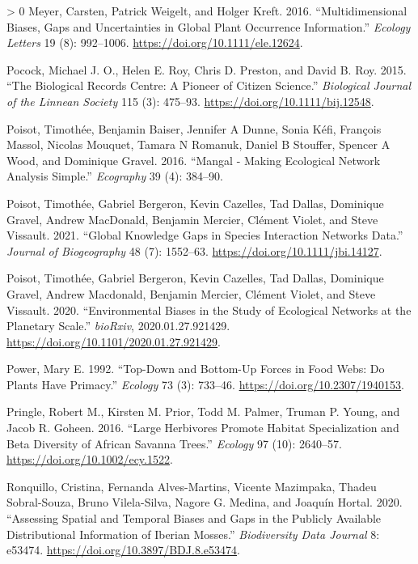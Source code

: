 \documentclass[10pt,oneside]{article}
\newlength{\cslhangindent}
\newenvironment{CSLReferences}[3] %
 {%
  \setlength{\parindent}{0pt}
  \ifodd #1 \everypar{\setlength{\hangindent}{\cslhangindent}}\ignorespaces\fi
  \ifnum #2 > 0
  \setlength{\parskip}{#2\baselineskip}
  \fi
 }%
 {}
\begin{document}
\begin{CSLReferences}{1}{0}
\leavevmode\hypertarget{ref-Meyer2016MulBia}{}%
Meyer, Carsten, Patrick Weigelt, and Holger Kreft. 2016.
{``Multidimensional Biases, Gaps and Uncertainties in Global Plant
Occurrence Information.''} \emph{Ecology Letters} 19 (8): 992--1006.
\url{https://doi.org/10.1111/ele.12624}.

\leavevmode\hypertarget{ref-Pocock2015BioRec}{}%
Pocock, Michael J. O., Helen E. Roy, Chris D. Preston, and David B. Roy.
2015. {``The Biological Records Centre: A Pioneer of Citizen Science.''}
\emph{Biological Journal of the Linnean Society} 115 (3): 475--93.
\url{https://doi.org/10.1111/bij.12548}.

\leavevmode\hypertarget{ref-Poisot2016ManMak}{}%
Poisot, Timothée, Benjamin Baiser, Jennifer A Dunne, Sonia Kéfi,
François Massol, Nicolas Mouquet, Tamara N Romanuk, Daniel B Stouffer,
Spencer A Wood, and Dominique Gravel. 2016. {``Mangal - Making
Ecological Network Analysis Simple.''} \emph{Ecography} 39 (4): 384--90.

\leavevmode\hypertarget{ref-Poisot2021GloKno}{}%
Poisot, Timothée, Gabriel Bergeron, Kevin Cazelles, Tad Dallas,
Dominique Gravel, Andrew MacDonald, Benjamin Mercier, Clément Violet,
and Steve Vissault. 2021. {``Global Knowledge Gaps in Species
Interaction Networks Data.''} \emph{Journal of Biogeography} 48 (7):
1552--63. \url{https://doi.org/10.1111/jbi.14127}.

\leavevmode\hypertarget{ref-Poisot2020EnvBia}{}%
Poisot, Timothée, Gabriel Bergeron, Kevin Cazelles, Tad Dallas,
Dominique Gravel, Andrew Macdonald, Benjamin Mercier, Clément Violet,
and Steve Vissault. 2020. {``Environmental Biases in the Study of
Ecological Networks at the Planetary Scale.''} \emph{bioRxiv},
2020.01.27.921429. \url{https://doi.org/10.1101/2020.01.27.921429}.

\leavevmode\hypertarget{ref-Power1992TopBot}{}%
Power, Mary E. 1992. {``Top-Down and Bottom-Up Forces in Food Webs: Do
Plants Have Primacy.''} \emph{Ecology} 73 (3): 733--46.
\url{https://doi.org/10.2307/1940153}.

\leavevmode\hypertarget{ref-Pringle2016LarHer}{}%
Pringle, Robert M., Kirsten M. Prior, Todd M. Palmer, Truman P. Young,
and Jacob R. Goheen. 2016. {``Large Herbivores Promote Habitat
Specialization and Beta Diversity of African Savanna Trees.''}
\emph{Ecology} 97 (10): 2640--57.
\url{https://doi.org/10.1002/ecy.1522}.

\leavevmode\hypertarget{ref-Ronquillo2020AssSpa}{}%
Ronquillo, Cristina, Fernanda Alves-Martins, Vicente Mazimpaka, Thadeu
Sobral-Souza, Bruno Vilela-Silva, Nagore G. Medina, and Joaquín Hortal.
2020. {``Assessing Spatial and Temporal Biases and Gaps in the Publicly
Available Distributional Information of Iberian Mosses.''}
\emph{Biodiversity Data Journal} 8: e53474.
\url{https://doi.org/10.3897/BDJ.8.e53474}.


\end{CSLReferences}
\end{document}
